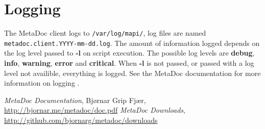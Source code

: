 \documentclass[titlepage, a4paper,10pt]{article}
\begin{document}
\section{Logging}
The MetaDoc client logs to \texttt{/var/log/mapi/}, log files are named \\
\texttt{metadoc.client.YYYY-mm-dd.log}. The amount of information logged
depends on the log level passed to \textbf{-l} on script execution. The
possible log levels are \textbf{debug}, \textbf{info}, \textbf{warning},
\textbf{error} and \textbf{critical}. When \textbf{-l} is not passed, or passed
with a log level not availible, everything is logged. See the MetaDoc 
documentation for more information on logging \cite{mdoc}.

\newpage
\begin{thebibliography}{99}
     \textit{MetaDoc Documentation}, Bjørnar Grip Fjær, 
        \url{http://bjornar.me/metadoc/doc.pdf}
     \textit{MetaDoc Downloads},
        \url{http://github.com/bjornarg/metadoc/downloads}
\end{thebibliography}
\end{document}

